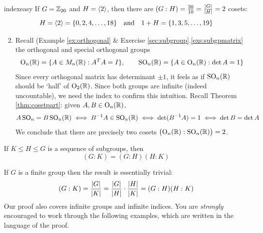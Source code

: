 \begin{examples}{}{indexeasy}
\exstart If $G=\mathbb{Z}_{20}$ and $H=\left\langle 2\right\rangle$, then there are $(G:H)=\frac{20}{10}=\frac{\left| G\right|}{\left| H\right|}=2$ cosets:
\[H=\left\langle 2\right\rangle=\{0,2,4,\ldots,18\}\quad\text{and}\quad 1+H=\{1,3,5,\ldots,19\}\]
\begin{enumerate}\setcounter{enumi}{1}
  \item Recall (Example \ref{ex:orthogonal} \& Exercise %
  \ref*{sec:subgroup}.\ref{exs:subgpmatrix} the orthogonal and special orthogonal groups
  \[
  \mathrm{O}_n(\mathbb{R})=\{A\in M_n(\mathbb{R}):A^TA=I\},\qquad \mathrm{SO}_n(\mathbb{R})=\{A\in\mathrm{O}_n(\mathbb{R}):\det A=1\}
  \]
  Since every orthogonal matrix has determinant $\pm 1$, it feels as if $\mathrm{SO}_n(\mathbb{R})$ should be `half' of $\mathrm{O}_2(\mathbb{R})$. Since both groups are infinite (indeed uncountable), we need the index to confirm this intuition. Recall Theorem \ref{thm:cosetpart}: given $A,B\in\mathrm{O}_n(\mathbb{R})$,
  \[A\,\mathrm{SO}_n=B\,\mathrm{SO}_n(\mathbb{R})\iff B^{-1}A\in\mathrm{SO}_n(\mathbb{R})\iff \det(B^{-1}A)=1\iff \det B=\det A\]
  We conclude that there are precisely two cosets $\bigl(\mathrm{O}_n(\mathbb{R}):\mathrm{SO}_n(\mathbb{R})\bigr)=2$.

\end{enumerate}
\end{examples}

\begin{thm}{}{}
If $K\le H\le G$ is a sequence of subgroups, then
\[(G:K)=(G:H)(H:K)\]
\end{thm}

If $G$ is a finite group then the result is essentially trivial:
\[(G:K)=\frac{\left| G\right|}{\left| K\right|}=\frac{\left| G\right|}{\left| H\right|}\cdot\frac{\left| H\right|}{\left| K\right|}=(G:H)(H:K)\]
Our proof also covers infinite groups and infinite indices. You are \emph{strongly} encouraged to work through the following examples, which are written in the language of the proof.


